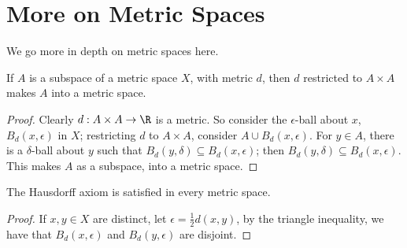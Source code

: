 
\section{More on Metric Spaces}

We go more in depth on metric spaces here.

\begin{theorem}\label{2.3.1}
    If $A$ is a subspace of a metric space $X$, with metric  $d$, then  $d$ restricted to  $A \times
    A$ makes  $A$ into a metric space.
\end{theorem}
\begin{proof}
    Clearly $d:A \times A \rightarrow \R$ is a metric. So consider the $\epsilon$-ball about $x$,
    $B_d(x,\epsilon)$ in $X$; restricting  $d$ to  $A \times A$, consider  $A \cup B_d(x,\epsilon)$.
    For $y \in A$, there is a  $\delta$-ball about  $y$ such that  $B_d(y,\delta)
    \subseteq B_d(x,\epsilon)$; then $B_d(y,\delta) \subseteq B_d(x,\epsilon)$. This makes $A$ as a subspace,
    into a metric space.
\end{proof}

\begin{theorem}\label{2.3.2}
    The Hausdorff axiom is satisfied in every metric space.
\end{theorem}
\begin{proof}
    If $x,y \in X$ are distinct, let  $\epsilon=\frac{1}{2}d(x,y)$, by the triangle inequality, we
    have that $B_d(x,\epsilon)$ and $B_d(y,\epsilon)$ are disjoint.
\end{proof}

